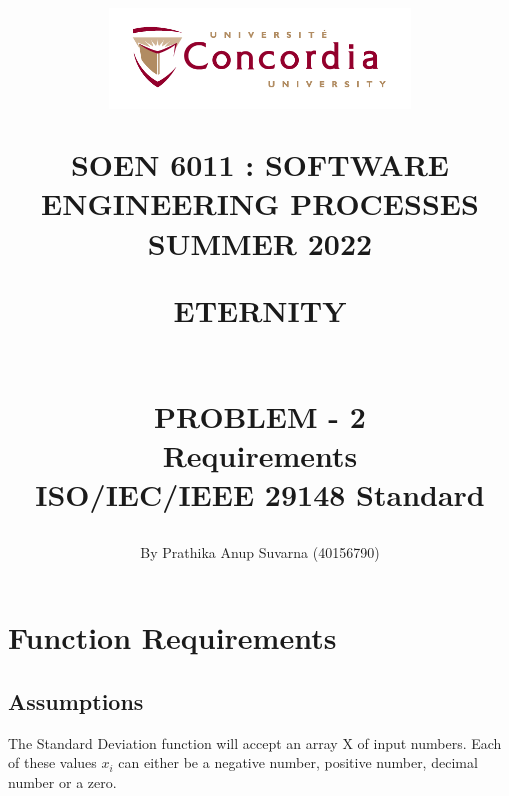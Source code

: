 \documentclass[12pt,letterpaper]{report}
\begin{document}
\title{\begin{figure}[htb]
\begin{center}
\includegraphics[width=8cm]{univ_logo}
\end{center}
\end{figure}SOEN 6011 : SOFTWARE ENGINEERING PROCESSES\\[.5em]
SUMMER 2022\\\vspace*{0.9in}
\begin{Large}
\textbf{ETERNITY} 
\end{Large}
\vspace*{0.9in}
\begin{Large}
\textbf{\\PROBLEM - 2} 
\\Requirements\\\footnotesize{ISO/IEC/IEEE} 29148 Standard 
\end{Large}}
\author{By Prathika Anup Suvarna (40156790)}
\maketitle 
{}
\setcounter{page}{0}

\tableofcontents


\chapter{Function Requirements}

\section{Assumptions}

\normalsize{The Standard Deviation function will accept an array X of input numbers. Each of these values $x_i$ can either be a negative number, positive number, decimal number or a zero.}
\end{document}
